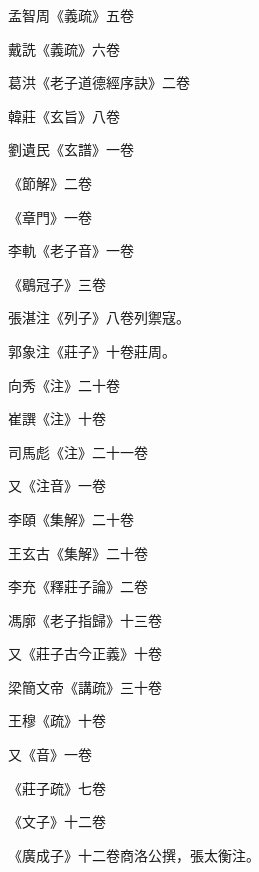 \begin{pinyinscope}
 孟智周《義疏》五卷



 戴詵《義疏》六卷



 葛洪《老子道德經序訣》二卷



 韓莊《玄旨》八卷



 劉遺民《玄譜》一卷



 《節解》二卷



 《章門》一卷



 李軌《老子音》一卷



 《鶡冠子》三卷



 張湛注《列子》八卷列禦寇。



 郭象注《莊子》十卷莊周。



 向秀《注》二十卷



 崔譔《注》十卷



 司馬彪《注》二十一卷



 又《注音》一卷



 李頤《集解》二十卷



 王玄古《集解》二十卷



 李充《釋莊子論》二卷



 馮廓《老子指歸》十三卷



 又《莊子古今正義》十卷



 梁簡文帝《講疏》三十卷



 王穆《疏》十卷



 又《音》一卷



 《莊子疏》七卷



 《文子》十二卷



 《廣成子》十二卷商洛公撰，張太衡注。




\end{pinyinscope}
